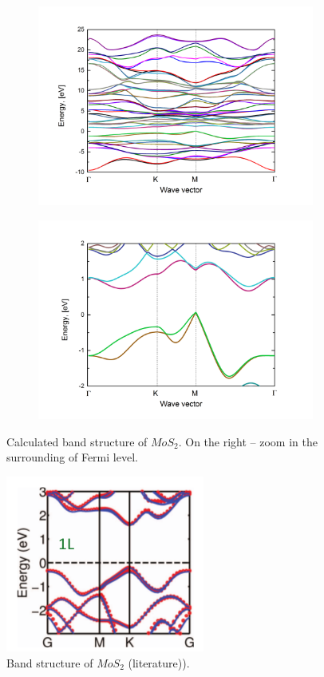 \begin{figure}[ht]
\begin{center}
\begin{subfigure}{.5\textwidth}
  \centering
  \includegraphics[width=\linewidth]{img/mos2_all}
  \label{fig:mos2_all}
\end{subfigure}%
\begin{subfigure}{.5\textwidth}
  \centering
  \includegraphics[width=\linewidth]{img/mos2_zoom}
  \label{fig:mos2_zoom}
\end{subfigure}
  \caption{Calculated band structure of $MoS_2$. On the right -- zoom in the surrounding of Fermi level.}
\end{center}
\end{figure}  


\begin{figure}[ht]
\begin{center}
  \includegraphics[width=0.3\linewidth]{img/MoS2_lit_band_struc}
  \caption{Band structure of $MoS_2$ (literature)).}
\end{center}
\end{figure}  
